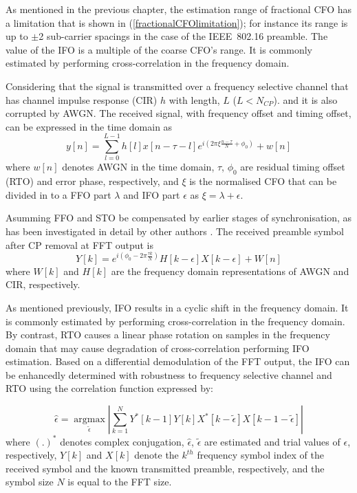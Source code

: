 As mentioned in the previous chapter, the estimation range of  fractional CFO has a limitation that is shown in (\ref{fractionalCFOlimitation}); for instance its range is up to $\pm$2 sub-carrier spacings in the case of the IEEE~802.16 preamble. The value of the IFO is a multiple of the coarse CFO's range.
It is commonly estimated by performing cross-correlation \cite{Bang2001,Kim2008} in the frequency domain. 

Considering that the signal is transmitted over a frequency selective channel that has channel impulse response (CIR) $h$ with length, $L$ ($L<N_{CP}$). and it is also corrupted by AWGN. The received signal, with frequency offset and timing offset, can be expressed in the time domain as
\begin{equation}
\label{xnfull}
y[n] = \sum_{l=0}^{L-1} h[l]x[n-\tau-l] e^{i(2\pi \xi \frac{n-\tau}{N} + \phi_0)} + w[n]
\end{equation}
where $w[n]$ denotes AWGN in the time domain, $\tau$, $\phi_0$ are residual timing offset (RTO) and error phase, respectively, and $\xi$ is the normalised CFO that can be divided in to a FFO part $\lambda$ and IFO part $\epsilon$ as $\xi=\lambda+\epsilon$.

Asumming FFO and STO be compensated by earlier stages of synchronisation, as has been investigated in detail by other authors \cite{Kim2008,Pham2014}.
The received preamble symbol after CP removal at FFT output is
\begin{equation}
\label{xnrec}
Y[k] =  e^{i(\phi_0-2\pi \frac{\tau k}{N})} H[k-\epsilon] X[k-\epsilon] + W[n]
\end{equation}
where $W[k]$ and $H[k]$ are the frequency domain representations of AWGN and CIR, respectively.

As mentioned previously, IFO results in a cyclic shift in the frequency domain. It is commonly estimated by performing cross-correlation in the frequency domain.
By contrast, RTO causes a linear phase rotation on samples in the frequency domain that may cause degradation of cross-correlation performing IFO estimation.
Based on a differential demodulation of the FFT output, the IFO can be enhancedly determined with robustness to frequency selective channel and RTO using the correlation function \cite{Park2002} expressed by:

\begin{equation}
\label{integerCFO}
\hat{\epsilon} =\underset{\tilde{\epsilon}}{\operatorname{argmax}}  \left|\sum_{k=1}^{N} Y^{*}[k-1] Y[k]  X^{*}[k-\tilde{\epsilon}]  X[k-1-\tilde{\epsilon}]\right|
\end{equation}
where $(.)^{*}$ denotes complex conjugation, $\hat{\epsilon}$, $\tilde{\epsilon}$ are estimated and trial values of $\epsilon$, respectively,
$Y[k]$ and $X[k]$ denote the $k^{th}$ frequency symbol index of the received symbol and the known transmitted preamble, respectively, and the symbol size $N$ is equal to the FFT size.

